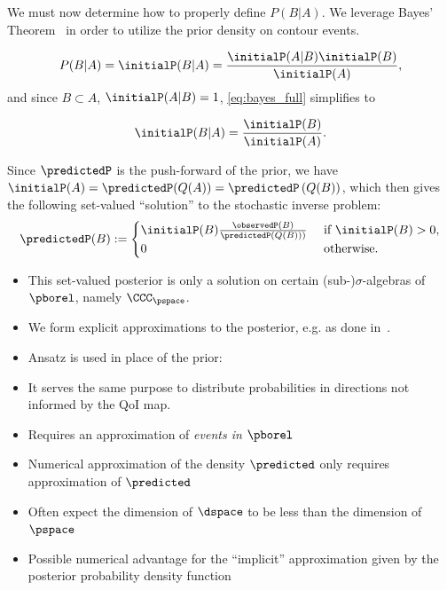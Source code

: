 \begin{frame}[t]
We must now determine how to properly define $P(B|A)$. 
We leverage Bayes' Theorem~\cite{Smith} in order to utilize the prior density on contour events.

\begin{equation}\label{eq:bayes_full}
P(B|A) = \initialP(B|A) = \frac{ \initialP(A|B) \initialP(B) }{ \initialP(A) },
\end{equation}
and since $B \subset A$, $\initialP(A|B) = 1$, \eqref{eq:bayes_full} simplifies to

\begin{equation}\label{eq:bayes}
\initialP(B|A) = \frac{ \initialP(B) }{ \initialP(A) }.
\end{equation}

Since $\predictedP$ is the push-forward of the prior, we have $\initialP(A) = \predictedP (Q(A)) = \predictedP \left (Q(B)\right )$, which then gives the following set-valued ``solution'' to the stochastic inverse problem:
\begin{equation}\label{eq:sip_sol_cont}
\predictedP(B) := \begin{cases}
\initialP(B) \frac{ \observedP(B) }{ \predictedP \left (Q(B)\right ) ) } & \text{ if } \initialP(B) > 0,\\
0 & \text{ otherwise}.
\end{cases}
\end{equation}

\end{frame}

\begin{frame}[t]
\begin{itemize}
	\item <1-> This set-valued posterior is only a solution on certain (sub-)$\sigma$-algebras of $\pborel$, namely $\CCC_\pspace$.
	\item <1> We form explicit approximations to the posterior, e.g. as done in~\cite{BET+14, BES12, BBE11}. 
	\item <2> Ansatz is used in place of the prior:
	\item <2> It serves the same purpose to distribute probabilities in directions not informed by the QoI map.
	\item <3-> Requires an approximation of \emph{events in $\pborel$}
	\item <4-> Numerical approximation of the density $\predicted$ only requires approximation of $\predicted$
	\item <5-> Often expect the dimension of $\dspace$ to be less than the dimension of $\pspace$
	\item <5-> Possible numerical advantage for the ``implicit'' approximation given by the posterior probability density function
\end{itemize}
\end{frame}

